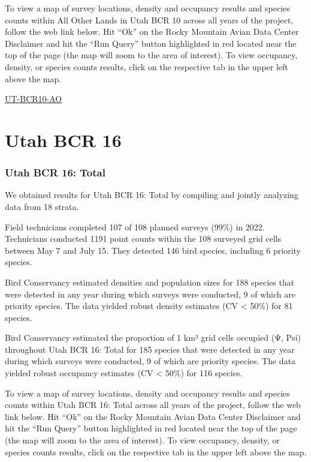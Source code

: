 \documentclass[
  letterpaper,
  DIV=11,
  numbers=noendperiod,
  oneside]{scrreprt}
\begin{document}
To view a map of survey locations, density and occupancy results and
species counts within All Other Lands in Utah BCR 10 across all years of
the project, follow the web link below. Hit ``Ok'' on the Rocky Mountain
Avian Data Center Disclaimer and hit the ``Run Query'' button
highlighted in red located near the top of the page (the map will zoom
to the area of interest). To view occupancy, density, or species counts
results, click on the respective tab in the upper left above the map.

\href{http://www.rmbo.org/new_site/adc/QueryWindow.aspx\#N4IgzgLgTghhCuBbEAuABCAqgFQLQCEBhAJQEYAGXAQQHl0qAbBtGiACwFMo0AZGAOwAmYEAF8gA}{UT-BCR10-AO}

\hypertarget{utah-bcr-16}{%
\section{Utah BCR 16}\label{utah-bcr-16}}

\hypertarget{utah-bcr-16-total}{%
\subsubsection{Utah BCR 16: Total}\label{utah-bcr-16-total}}

We obtained results for Utah BCR 16: Total by compiling and jointly
analyzing data from 18 strata.

Field technicians completed 107 of 108 planned surveys (99\%) in 2022.
Technicians conducted 1191 point counts within the 108 surveyed grid
cells between May 7 and July 15. They detected 146 bird species,
including 6 priority species.

Bird Conservancy estimated densities and population sizes for 188
species that were detected in any year during which surveys were
conducted, 9 of which are priority species. The data yielded robust
density estimates (CV \textless{} 50\%) for 81 species.

Bird Conservancy estimated the proportion of 1 km² grid cells occupied
(Ψ, Psi) throughout Utah BCR 16: Total for 185 species that were
detected in any year during which surveys were conducted, 9 of which are
priority species. The data yielded robust occupancy estimates (CV
\textless{} 50\%) for 116 species.

To view a map of survey locations, density and occupancy results and
species counts within Utah BCR 16: Total across all years of the
project, follow the web link below. Hit ``Ok'' on the Rocky Mountain
Avian Data Center Disclaimer and hit the ``Run Query'' button
highlighted in red located near the top of the page (the map will zoom
to the area of interest). To view occupancy, density, or species counts
results, click on the respective tab in the upper left above the map.
\end{document}
